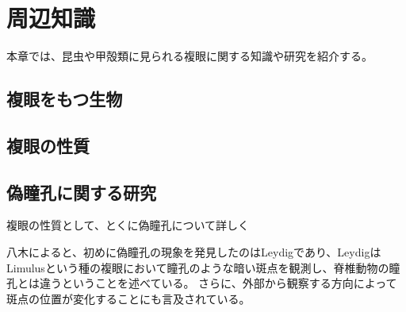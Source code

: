 \chapter{周辺知識}
\label{CKnowledge}

本章では、昆虫や甲殻類に見られる複眼に関する知識や研究を紹介する。

\section{複眼をもつ生物}


\section{複眼の性質}


\section{偽瞳孔に関する研究}

複眼の性質として、とくに偽瞳孔について詳しく


八木\cite{}によると、初めに偽瞳孔の現象を発見したのはLeydig\cite{}であり、LeydigはLimulusという種の複眼において瞳孔のような暗い斑点を観測し、脊椎動物の瞳孔とは違うということを述べている。
さらに、外部から観察する方向によって斑点の位置が変化することにも言及されている。
